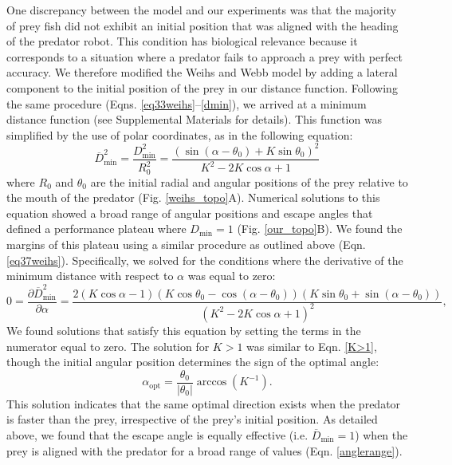 \documentclass[12pt]{article}
\def\ds{\displaystyle}
\def\d{\partial}
\newcommand{\ol}{\overline}
\begin{document}
One discrepancy between the model and our experiments was that the majority of prey fish did not exhibit an initial position that was aligned with the heading of the predator robot. This condition has biological relevance because it corresponds to a situation where a predator fails to approach a prey with perfect accuracy. 
We therefore modified the Weihs and Webb model by adding a lateral component to the initial position of the prey in our distance function. 
Following the same procedure (Eqns. \ref{eq33weihs}--\ref{dmin}), we arrived at a minimum distance function (see Supplemental Materials for details). This function was simplified by the use of polar coordinates, as in the following equation:
%
\begin{equation}
\ol{D}^2_{\text{min}}= \ds\frac{{D}^2_{\text{min}}}{R_0^2 }=
\ds\frac{\left ( \sin(\alpha - \theta_0) + K \sin \theta_0 \right )^2}{K^2-2 K \cos \alpha +1} 
\label{Dmin_polar}
\end{equation}
%
where $R_0$ and $\theta_0$ are the initial radial and angular positions of the prey relative to the mouth of the predator (Fig. \ref{weihs_topo}A). Numerical solutions to this equation showed a broad range of angular positions and escape angles that defined a performance plateau where $D_{\text{min}}=1$ (Fig. \ref{our_topo}B). 
We found the margins of this plateau using a similar procedure as outlined above (Eqn. \ref{eq37weihs}). Specifically, we solved for the conditions where the derivative of the minimum distance with respect to $\alpha$ was equal to zero:
%
\begin{equation}
0 = \frac{\d \ol{D}^2_{\text{min}}}{\d \alpha} = 
\frac{2(K \cos \alpha - 1)(K\cos \theta_0 - \cos(\alpha - \theta_0))(K\sin \theta_0 + \sin(\alpha -\theta_0))}
{(K^2 - 2K \cos \alpha + 1)^2},
\label{DminDalpha}
\end{equation} 
%
We found solutions that satisfy this equation by setting the terms in the numerator equal to zero. The solution for $K>1$ was similar to Eqn. \ref{K>1}, though the initial angular position determines the sign of the optimal angle: 
%
\begin{equation}
\alpha_{\text{opt}} = \frac{\theta_0}{|\theta_0|}  \arccos(K^{-1}).
\label{DminDalpha}
\end{equation} 
%
This solution indicates that the same optimal direction exists when the predator is faster than the prey, irrespective of the prey's initial position. As detailed above, we found that the escape angle is equally effective (i.e. $\ol D_{\text{min}}=1$) when the prey is aligned with the predator for a broad range of values (Eqn. \ref{anglerange}). 
\end{document}

